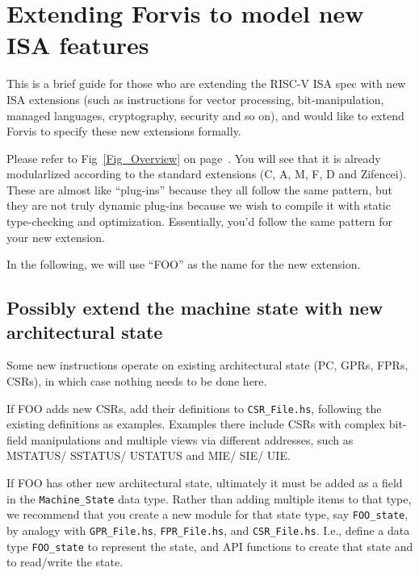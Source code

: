 \documentclass[11pt]{article}
\begin{document}

\newpage

\section{Extending Forvis to model new ISA features}

\label{sec_extending_forvis}

This is a brief guide for those who are extending the RISC-V ISA spec
with new ISA extensions (such as instructions for vector processing,
bit-manipulation, managed languages, cryptography, security and so
on), and would like to extend Forvis to specify these new extensions
formally.

Please refer to Fig~\ref{Fig_Overview} on page~\pageref{Fig_Overview}.
You will see that it is already modularlized according to the standard
extensions (C, A, M, F, D and Zifencei).  These are almost like
``plug-ins'' because they all follow the same pattern, but they are
not truly dynamic plug-ins because we wish to compile it with static
type-checking and optimization.  Essentially, you'd follow the same
pattern for your new extension.

In the following, we will use ``FOO'' as the name for the new extension.


\subsection{Possibly extend the machine state with new architectural state}

Some new instructions operate on existing architectural state (PC,
GPRs, FPRs, CSRs), in which case nothing needs to be done here.

If FOO adds new CSRs, add their definitions to \verb|CSR_File.hs|,
following the existing definitions as examples.  Examples there
include CSRs with complex bit-field manipulations and multiple views
via different addresses, such as MSTATUS/ SSTATUS/ USTATUS and MIE/
SIE/ UIE.

If FOO has other new architectural state, ultimately it must be added
as a field in the \verb|Machine_State| data type.  Rather than adding
multiple items to that type, we recommend that you create a new module
for that state type, say \verb|FOO_state|, by analogy with
\verb|GPR_File.hs|, \verb|FPR_File.hs|, and \verb|CSR_File.hs|.  I.e.,
define a data type \verb|FOO_state| to represent the state, and API
functions to create that state and to read/write the state.
\end{document}
